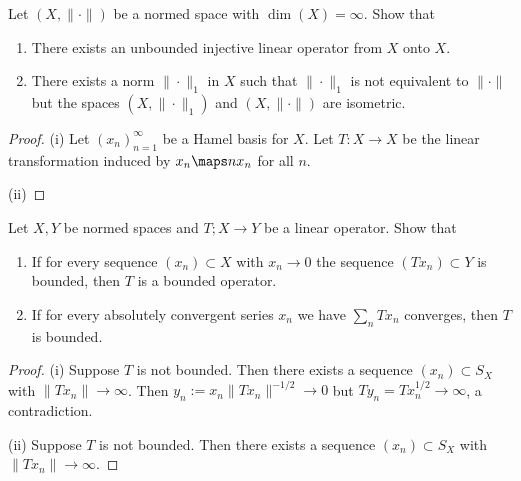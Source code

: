 \documentclass{article}
\begin{document}
 Let $(X, \| \cdot \|)$ be a normed space with $\dim(X) = \infty$. Show that
\begin{enumerate}
\item There exists an unbounded injective linear operator from $X$ onto $X$.
\item There exists a norm $\| \cdot \|_1$ in $X$ such that $\|\cdot \|_1$ is not equivalent to $\| \cdot \|$ but the spaces $(X, \| \cdot \|_1)$ and $(X, \| \cdot \|)$ are isometric.
\end{enumerate}
\begin{proof}
(i) Let $(x_n)_{n=1}^\infty$ be a Hamel basis for $X$. Let $T: X \to X$ be the linear transformation induced by $x_n \maps n x_n$ for all $n$.

(ii) %
\end{proof}



 Let $X, Y$ be normed spaces and $T; X \to Y$ be a linear operator. Show that 
\begin{enumerate}
\item If for every sequence $(x_n) \subset X$ with $x_n \to 0$ the sequence $(Tx_n) \subset Y$ is bounded, then $T$ is a bounded operator.
\item If for every absolutely convergent series $x_n$ we have $\sum_n Tx_n$ converges, then $T$ is bounded.
\end{enumerate}

\begin{proof}
(i) Suppose $T$ is not bounded.  Then there exists a sequence $(x_n) \subset S_X$ with $\|Tx_n\| \to \infty$.  Then $y_n := x_n \|Tx_n\|^{-1/2} \to 0$ but
$Ty_n = Tx_n^{1/2} \to \infty$, a contradiction.

(ii) Suppose $T$ is not bounded.  Then there exists a sequence $(x_n) \subset S_X$ with $\|Tx_n\| \to \infty$.  


\end{proof}
\end{document}
